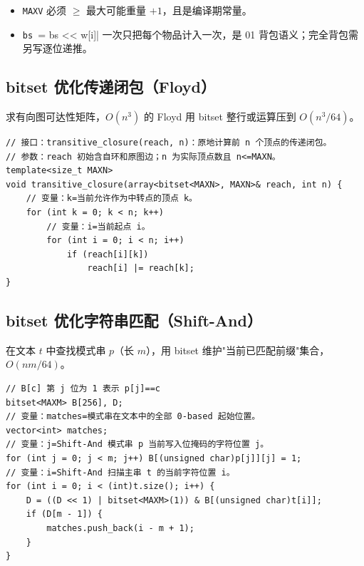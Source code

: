 \documentclass[UTF8,openany,oneside,zihao=-4]{ctexbook}
\begin{document}
\begin{warn}
\begin{itemize}
  \item \lstinline|MAXV| 必须 $\ge$ 最大可能重量 $+1$，且是编译期常量。
  \item \lstinline|bs |= bs << w[i]| 一次只把每个物品计入一次，是 01 背包语义；完全背包需另写逐位递推。
\end{itemize}
\end{warn}

\subsection{bitset 优化传递闭包（Floyd）}

\begin{note}
求有向图可达性矩阵，$O(n^3)$ 的 Floyd 用 bitset 整行或运算压到 $O(n^3/64)$。
\end{note}

\begin{lstlisting}
// 接口：transitive_closure(reach, n)：原地计算前 n 个顶点的传递闭包。
// 参数：reach 初始含自环和原图边；n 为实际顶点数且 n<=MAXN。
template<size_t MAXN>
void transitive_closure(array<bitset<MAXN>, MAXN>& reach, int n) {
    // 变量：k=当前允许作为中转点的顶点 k。
    for (int k = 0; k < n; k++)
        // 变量：i=当前起点 i。
        for (int i = 0; i < n; i++)
            if (reach[i][k])
                reach[i] |= reach[k];
}
\end{lstlisting}

\subsection{bitset 优化字符串匹配（Shift-And）}

\begin{note}
在文本 $t$ 中查找模式串 $p$（长 $m$），用 bitset 维护"当前已匹配前缀"集合，$O(nm/64)$。
\end{note}

\begin{lstlisting}
// B[c] 第 j 位为 1 表示 p[j]==c
bitset<MAXM> B[256], D;
// 变量：matches=模式串在文本中的全部 0-based 起始位置。
vector<int> matches;
// 变量：j=Shift-And 模式串 p 当前写入位掩码的字符位置 j。
for (int j = 0; j < m; j++) B[(unsigned char)p[j]][j] = 1;
// 变量：i=Shift-And 扫描主串 t 的当前字符位置 i。
for (int i = 0; i < (int)t.size(); i++) {
    D = ((D << 1) | bitset<MAXM>(1)) & B[(unsigned char)t[i]];
    if (D[m - 1]) {
        matches.push_back(i - m + 1);
    }
}
\end{lstlisting}
\end{document}
